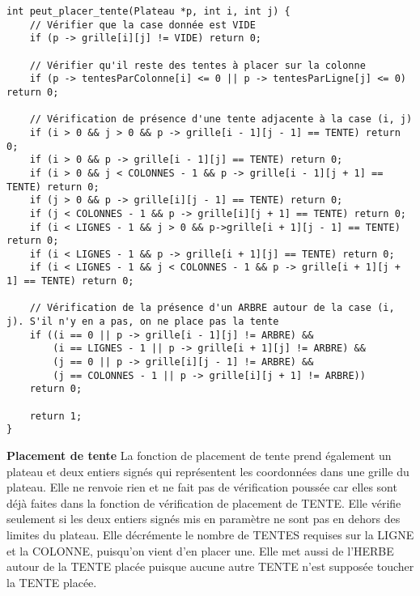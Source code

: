 \documentclass{article}
\begin{document}
\begin{lstlisting}[style=Cstyle]
int peut_placer_tente(Plateau *p, int i, int j) {
    // Vérifier que la case donnée est VIDE
    if (p -> grille[i][j] != VIDE) return 0;

    // Vérifier qu'il reste des tentes à placer sur la colonne
    if (p -> tentesParColonne[i] <= 0 || p -> tentesParLigne[j] <= 0) return 0;

    // Vérification de présence d'une tente adjacente à la case (i, j)
    if (i > 0 && j > 0 && p -> grille[i - 1][j - 1] == TENTE) return 0;
    if (i > 0 && p -> grille[i - 1][j] == TENTE) return 0;
    if (i > 0 && j < COLONNES - 1 && p -> grille[i - 1][j + 1] == TENTE) return 0;
    if (j > 0 && p -> grille[i][j - 1] == TENTE) return 0;
    if (j < COLONNES - 1 && p -> grille[i][j + 1] == TENTE) return 0;
    if (i < LIGNES - 1 && j > 0 && p->grille[i + 1][j - 1] == TENTE) return 0;
    if (i < LIGNES - 1 && p -> grille[i + 1][j] == TENTE) return 0;
    if (i < LIGNES - 1 && j < COLONNES - 1 && p -> grille[i + 1][j + 1] == TENTE) return 0;

    // Vérification de la présence d'un ARBRE autour de la case (i, j). S'il n'y en a pas, on ne place pas la tente
    if ((i == 0 || p -> grille[i - 1][j] != ARBRE) &&
        (i == LIGNES - 1 || p -> grille[i + 1][j] != ARBRE) &&
        (j == 0 || p -> grille[i][j - 1] != ARBRE) &&
        (j == COLONNES - 1 || p -> grille[i][j + 1] != ARBRE))
    return 0;

    return 1;
}
\end{lstlisting}

\textbf{Placement de tente}
    La fonction de placement de tente prend également un plateau et deux entiers signés qui représentent les coordonnées dans une grille du plateau. Elle ne renvoie rien et ne fait pas de vérification poussée car elles sont déjà faites dans la fonction de vérification de placement de TENTE. Elle vérifie seulement si les deux entiers signés mis en paramètre ne sont pas en dehors des limites du plateau. Elle décrémente le nombre de TENTES requises sur la LIGNE et la COLONNE, puisqu'on vient d'en placer une. Elle met aussi de l'HERBE autour de la TENTE placée puisque aucune autre TENTE n'est supposée toucher la TENTE placée.
\end{document}
